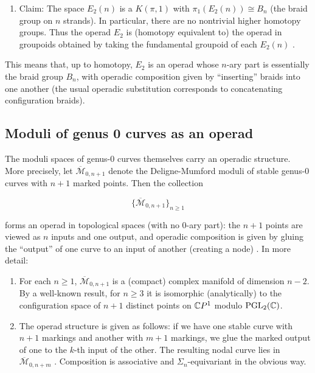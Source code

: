 \begin{enumerate}
    \item Claim: The space $E_2(n)$ is a $K(\pi,1)$ with $\pi_1(E_2(n))\cong B_n$ (the braid group on $n$ strands).  In particular, there are no nontrivial higher homotopy groups.  Thus the operad $E_2$ is (homotopy equivalent to) the operad in groupoids obtained by taking the fundamental groupoid of each $E_2(n)$ \cite{C_2014}.
\end{enumerate}

This means that, up to homotopy, $E_2$ is an operad whose $n$-ary part is essentially the braid group $B_n$, with operadic composition given by “inserting” braids into one another (the usual operadic substitution corresponds to concatenating configuration braids).

\subsection{Moduli of genus 0 curves as an operad}

The moduli spaces of genus-0 curves themselves carry an operadic structure.  More precisely, let $\overline{\mathcal{M}}_{0,n+1}$ denote the Deligne-Mumford moduli of stable genus-0 curves with $n+1$ marked points.  Then the collection

$$
  \{\overline{\mathcal{M}}_{0,n+1}\}_{n\ge1}
$$

forms an operad in topological spaces (with no $0$-ary part): the $n+1$ points are viewed as $n$ inputs and one output, and operadic composition is given by gluing the “output” of one curve to an input of another (creating a node) \cite{de_Brito_Horel_Robertson_2019}. In more detail:

\begin{enumerate}
    \item For each $n\ge1$, $\overline{\mathcal{M}}_{0,n+1}$ is a (compact) complex manifold of dimension $n-2$.  By a well-known result, for $n\ge3$ it is isomorphic (analytically) to the configuration space of $n+1$ distinct points on $\mathbb{C} P^1$ modulo $\mathrm{PGL}_2(\mathbb{C})$.
    \item The operad structure is given as follows: if we have one stable curve with $n+1$ markings and another with $m+1$ markings, we glue the marked output of one to the $k$-th input of the other.  The resulting nodal curve lies in $\overline{\mathcal{M}}_{0,n+m}$ \cite{de_Brito_Horel_Robertson_2019}. Composition is associative and $\Sigma_n$-equivariant in the obvious way.
\end{enumerate}

